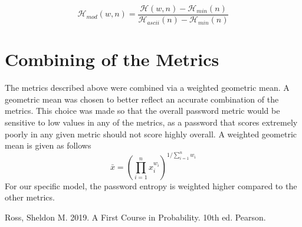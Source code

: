 \documentclass{article}
\begin{document}
\[\mathcal{H}_{mod}(w,n)=\frac{\mathcal{H}(w,n)-\mathcal{H}_{min}(n)}{\mathcal{H}_{ascii}(n)-\mathcal{H}_{min}(n)}\]

\section{Combining of the Metrics}
The metrics described above were combined via a weighted geometric mean. A geometric mean was chosen to better reflect an accurate combination of the metrics. 
This choice was made so that the overall password metric would be sensitive to low values in any of the metrics, as a password that scores extremely poorly in any given metric should not score highly overall.
A weighted geometric mean is given as follows
\[
\bar{x} = \left(\prod_{i=1}^{n} x_i^{w_i}\right)^{1/\sum_{i=1}^n w_i}
\]
For our specific model, the password entropy is weighted higher compared to the other metrics.

\newpage
\begin{thebibliography}{00}
 Ross, Sheldon M. 2019. A First Course in Probability. 10th ed. Pearson.
\end{thebibliography}
\end{document}
